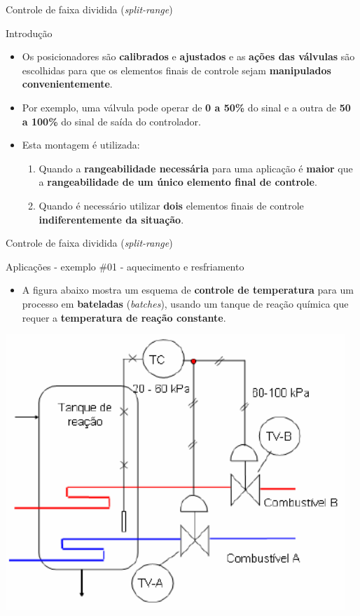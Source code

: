 \begin{frame}{Controle de faixa dividida (\textit{split-range})}
	\begin{block}{Introdução}
		\begin{itemize}
			\item Os posicionadores são \textbf{calibrados} e \textbf{ajustados} e as \textbf{ações das válvulas} são escolhidas para que os elementos finais de controle sejam \textbf{manipulados convenientemente}.
			\item Por exemplo, uma válvula pode operar de \textbf{0 a 50\%} do sinal e a outra de \textbf{50 a 100\%} do sinal de saída do controlador.
			\item Esta montagem é utilizada:
			\begin{enumerate}
				\item\normalsize Quando a \textbf{rangeabilidade necessária} para uma aplicação é \textbf{maior} que a \textbf{rangeabilidade de um único elemento final de controle}.
				\item\normalsize Quando é necessário utilizar \textbf{dois} elementos finais de controle \textbf{indiferentemente da situação}.
			\end{enumerate}
		\end{itemize}
	\end{block}
\end{frame}


\begin{frame}{Controle de faixa dividida (\textit{split-range})}
	\begin{block}{Aplicações - exemplo \#01 - aquecimento e resfriamento}
		\begin{itemize}
			\item A figura abaixo mostra um esquema de \textbf{controle de temperatura} para um processo em \textbf{bateladas} (\textit{batches}), usando um tanque de reação química que requer a \textbf{temperatura de reação constante}.
		\end{itemize}
	\end{block}
	
	\centering
	\includegraphics[width=0.55\linewidth]{Figuras/Ch15/fig11}
\end{frame}


